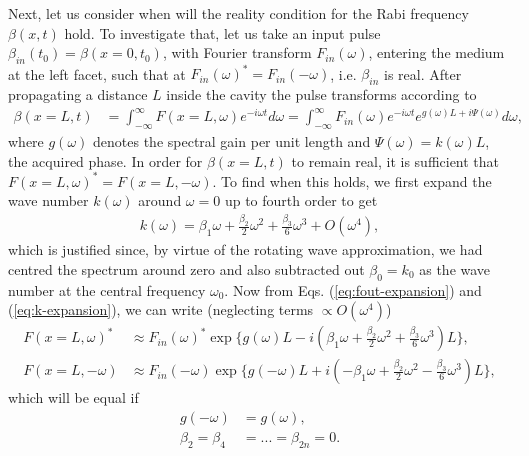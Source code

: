 \documentclass[preprint,secnumarabic,amssymb, nobibnotes, aip, prd]{revtex4-1}
\begin{document}
Next, let us consider when will the reality condition for the Rabi frequency $\beta(x,t)$  hold. To investigate that, let us take an input pulse $\beta_{in}(t_0) = \beta(x=0,t_0)$, with Fourier transform $F_{in}(\omega)$, entering the medium at the left facet, such that at $F_{in}(\omega)^* = F_{in}(-\omega)$, i.e. $\beta_{in}$ is real. After propagating a distance $L$ inside the cavity the pulse transforms according to \cite{weiner2011ultrafast}
\begin{align}
\label{eq:fout-expansion}
\beta(x=L,t) &= \int_{-\infty}^{\infty} F(x=L,\omega)e^{-i\omega t}d\omega = \int_{-\infty}^{\infty} F_{in}(\omega)e^{-i\omega t}e^{g(\omega)L+i\Psi(\omega)}d\omega,
\end{align}
where $g(\omega)$ denotes the spectral gain per unit length and $\Psi(\omega)=k(\omega)L$, the acquired phase. In order for $\beta(x=L,t)$ to remain real, it is sufficient that $F(x=L,\omega)^*= F(x=L,-\omega)$. To find when this holds, we first expand the wave number $k(\omega)$ around $\omega=0$ up to fourth order to get  
\begin{align}
\label{eq:k-expansion}
k(\omega) = \beta_1\omega + \frac{\beta_2}{2}\omega^2 + \frac{\beta_3}{6}\omega^3 + O(\omega^4), 
\end{align}
which is justified since, by virtue of the rotating wave approximation, we had centred the spectrum around zero and also subtracted out $\beta_0 = k_0$ as the wave number at the central frequency $\omega_0$. Now from Eqs. (\ref{eq:fout-expansion}) and (\ref{eq:k-expansion}), we can write (neglecting terms $\propto O(\omega^4)$)
\begin{subequations}
	\begin{align}
	F(x=L,\omega)^* &\approx F_{in}(\omega)^* \exp\{g(\omega)L-i(\beta_1\omega + \frac{\beta_2}{2}\omega^2 + \frac{\beta_3}{6}\omega^3 )L\}, \\
	F(x=L,-\omega) &\approx F_{in}(-\omega) \exp\{g(-\omega)L+i(-\beta_1\omega + \frac{\beta_2}{2}\omega^2 - \frac{\beta_3}{6}\omega^3 )L\},
	\end{align}
\end{subequations}
which will be equal if
\begin{subequations}
	\begin{align}
	g(-\omega) &= g(\omega), \label{eq:symmetric-gain}\\
	\beta_2 = \beta_4 &= ... = \beta_{2n}=0. \label{eq:vanish-even-order-dispersion}
	\end{align}
\end{subequations}
\end{document}
